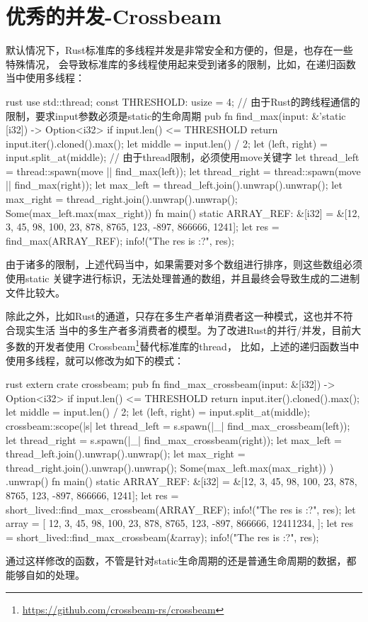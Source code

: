 \section{优秀的并发-Crossbeam}
默认情况下，Rust标准库的多线程并发是非常安全和方便的，但是，也存在一些特殊情况，
会导致标准库的多线程使用起来受到诸多的限制，比如，在递归函数当中使用多线程：
\begin{code-block}{rust}
use std::thread;
const THRESHOLD: usize = 4;
// 由于Rust的跨线程通信的限制，要求input参数必须是static的生命周期
pub fn find_max(input: &'static [i32]) -> Option<i32> {
    if input.len() <= THRESHOLD {
        return input.iter().cloned().max();
    }
    let middle = input.len() / 2;
    let (left, right) = input.split_at(middle);
    // 由于thread限制，必须使用move关键字
    let thread_left = thread::spawn(move || find_max(left));
    let thread_right = thread::spawn(move || find_max(right));
    let max_left = thread_left.join().unwrap().unwrap();
    let max_right = thread_right.join().unwrap().unwrap();
    Some(max_left.max(max_right))
}
fn main() {
    static ARRAY_REF: &[i32] = &[12, 3, 45, 98, 100, 23, 878, 8765, 123, -897, 866666, 1241];
    let res = find_max(ARRAY_REF);
    info!("The res is {:?}", res);
}
\end{code-block}
由于诸多的限制，上述代码当中，如果需要对多个数组进行排序，则这些数组必须使用static
关键字进行标识，无法处理普通的数组，并且最终会导致生成的二进制文件比较大。

除此之外，比如Rust的通道，只存在多生产者单消费者这一种模式，这也并不符合现实生活
当中的多生产者多消费者的模型。为了改进Rust的并行/并发，目前大多数的开发者使用
Crossbeam\footnote{\url{https://github.com/crossbeam-rs/crossbeam}}替代标准库的thread，
比如，上述的递归函数当中使用多线程，就可以修改为如下的模式：
\begin{code-block}{rust}
extern crate crossbeam;
pub fn find_max_crossbeam(input: &[i32]) -> Option<i32> {
    if input.len() <= THRESHOLD {
        return input.iter().cloned().max();
    }
    let middle = input.len() / 2;
    let (left, right) = input.split_at(middle);
    crossbeam::scope(|s| {
        let thread_left = s.spawn(|_| find_max_crossbeam(left));
        let thread_right = s.spawn(|_| find_max_crossbeam(right));
        let max_left = thread_left.join().unwrap().unwrap();
        let max_right = thread_right.join().unwrap().unwrap();
        Some(max_left.max(max_right))
    })
    .unwrap()
}
fn main() {
    static ARRAY_REF: &[i32] = &[12, 3, 45, 98, 100, 23, 878, 8765, 123, -897, 866666, 1241];
    let res = short_lived::find_max_crossbeam(ARRAY_REF);
    info!("The res is {:?}", res);
    let array = [
        12, 3, 45, 98, 100, 23, 878, 8765, 123, -897, 866666, 12411234,
    ];
    let res = short_lived::find_max_crossbeam(&array);
    info!("The res is {:?}", res);
}
\end{code-block}
通过这样修改的函数，不管是针对static生命周期的还是普通生命周期的数据，都能够自如的处理。

